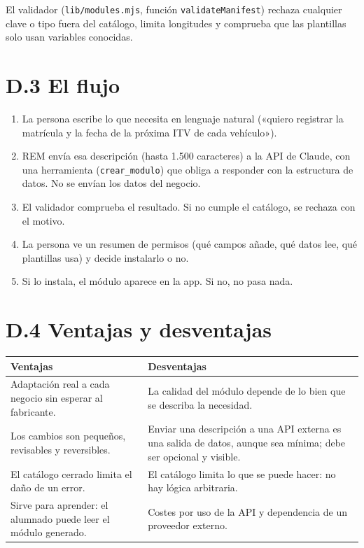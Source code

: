 El validador (\texttt{lib/modules.mjs}, función \texttt{validateManifest}) rechaza cualquier clave o tipo fuera del catálogo, limita longitudes y comprueba que las plantillas solo usan variables conocidas.

\section{D.3 El flujo}\label{d.3-el-flujo}

\begin{enumerate}
\def\labelenumi{\arabic{enumi}.}
\tightlist
\item
  La persona escribe lo que necesita en lenguaje natural («quiero registrar la matrícula y la fecha de la próxima ITV de cada vehículo»).
\item
  REM envía esa descripción (hasta 1.500 caracteres) a la API de Claude, con una herramienta (\texttt{crear\_modulo}) que obliga a responder con la estructura de datos. No se envían los datos del negocio.
\item
  El validador comprueba el resultado. Si no cumple el catálogo, se rechaza con el motivo.
\item
  La persona ve un resumen de permisos (qué campos añade, qué datos lee, qué plantillas usa) y decide instalarlo o no.
\item
  Si lo instala, el módulo aparece en la app. Si no, no pasa nada.
\end{enumerate}

\section{D.4 Ventajas y desventajas}\label{d.4-ventajas-y-desventajas}

{\def\LTcaptype{none} %
\begin{longtable}[]{@{}
  >{\raggedright\arraybackslash}p{}
  >{\raggedright\arraybackslash}p{}@{}}
\toprule\noalign{}
\begin{minipage}[b]{\linewidth}\raggedright
Ventajas
\end{minipage} & \begin{minipage}[b]{\linewidth}\raggedright
Desventajas
\end{minipage} \\
\midrule\noalign{}
\endhead
\bottomrule\noalign{}
\endlastfoot
Adaptación real a cada negocio sin esperar al fabricante. & La calidad del módulo depende de lo bien que se describa la necesidad. \\
Los cambios son pequeños, revisables y reversibles. & Enviar una descripción a una API externa es una salida de datos, aunque sea mínima; debe ser opcional y visible. \\
El catálogo cerrado limita el daño de un error. & El catálogo limita lo que se puede hacer: no hay lógica arbitraria. \\
Sirve para aprender: el alumnado puede leer el módulo generado. & Costes por uso de la API y dependencia de un proveedor externo. \\
\end{longtable}
}

